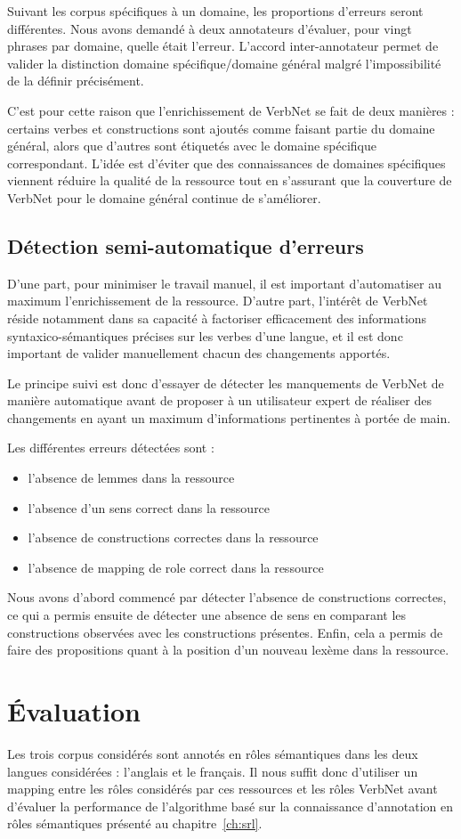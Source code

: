 Suivant les corpus spécifiques à un domaine, les proportions d'erreurs seront
différentes. Nous avons demandé à deux annotateurs d'évaluer, pour vingt
phrases par domaine, quelle était l'erreur. L'accord inter-annotateur permet de
valider la distinction domaine spécifique/domaine général malgré
l'impossibilité de la définir précisément.

C'est pour cette raison que l'enrichissement de VerbNet se fait de deux
manières : certains verbes et constructions sont ajoutés comme faisant partie
du domaine général, alors que d'autres sont étiquetés avec le domaine
spécifique correspondant. L'idée est d'éviter que des connaissances de domaines
spécifiques viennent réduire la qualité de la ressource tout en s'assurant que
la couverture de VerbNet pour le domaine général continue de s'améliorer.

\subsection{Détection semi-automatique d'erreurs}

D'une part, pour minimiser le travail manuel, il est important d'automatiser au
maximum l'enrichissement de la ressource. D'autre part, l'intérêt de VerbNet
réside notamment dans sa capacité à factoriser efficacement des informations
syntaxico-sémantiques précises sur les verbes d'une langue, et il est donc
important de valider manuellement chacun des changements apportés.

Le principe suivi est donc d'essayer de détecter les manquements de VerbNet de
manière automatique avant de proposer à un utilisateur expert de réaliser des
changements en ayant un maximum d'informations pertinentes à portée de main.

Les différentes erreurs détectées sont :
\begin{itemize}
    \item l'absence de lemmes dans la ressource
    \item l'absence d'un sens correct dans la ressource
    \item l'absence de constructions correctes dans la ressource
    \item l'absence de mapping de role correct dans la ressource
\end{itemize}

Nous avons d'abord commencé par détecter l'absence de constructions correctes,
ce qui a permis ensuite de détecter une absence de sens en comparant les
constructions observées avec les constructions présentes. Enfin, cela a permis
de faire des propositions quant à la position d'un nouveau lexème dans la
ressource.

\section{Évaluation}

Les trois corpus considérés sont annotés en rôles sémantiques dans les deux
langues considérées : l'anglais et le français. Il nous suffit donc d'utiliser
un mapping entre les rôles considérés par ces ressources et les rôles VerbNet
avant d'évaluer la performance de l'algorithme basé sur la connaissance
d'annotation en rôles sémantiques présenté au chapitre~\ref{ch:srl}.
